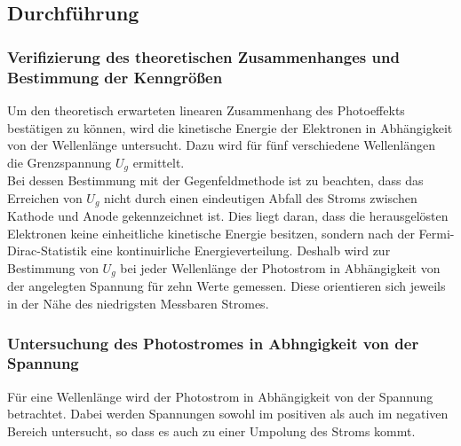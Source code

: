 \subsection{Durchführung}
\label{sec:durchführung}

\subsubsection{Verifizierung des theoretischen Zusammenhanges und Bestimmung der Kenngrößen}
Um den theoretisch erwarteten linearen Zusammenhang des Photoeffekts bestätigen zu können, wird die kinetische Energie der Elektronen in Abhängigkeit von der Wellenlänge untersucht.
Dazu wird für fünf verschiedene Wellenlängen die Grenzspannung $U_g$ ermittelt.\\
Bei dessen Bestimmung mit der Gegenfeldmethode ist zu beachten, dass das Erreichen von $U_g$ nicht durch einen eindeutigen Abfall des Stroms zwischen Kathode und Anode gekennzeichnet ist.
Dies liegt daran, dass die herausgelösten Elektronen keine einheitliche kinetische Energie besitzen, sondern nach der Fermi-Dirac-Statistik eine kontinuirliche Energieverteilung.
Deshalb wird zur Bestimmung von $U_g$ bei jeder Wellenlänge der Photostrom in Abhängigkeit von der angelegten Spannung für zehn Werte gemessen.
Diese orientieren sich jeweils in der Nähe des niedrigsten Messbaren Stromes.

\subsubsection{Untersuchung des Photostromes in Abhngigkeit von der Spannung}
Für eine Wellenlänge wird der Photostrom in Abhängigkeit von der Spannung betrachtet.
Dabei werden Spannungen sowohl im positiven als auch im negativen Bereich untersucht, so dass es auch zu einer Umpolung des Stroms kommt.
